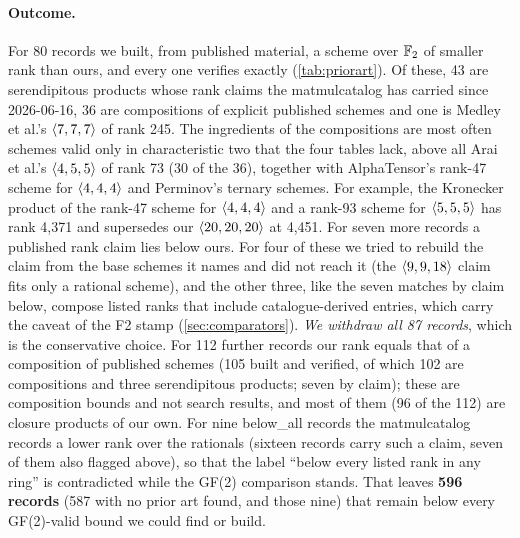 \paragraph{Outcome.}
For 80 records we built, from published material, a scheme over ${\mathbb{F}_2}$ of smaller rank than ours, and every one verifies exactly (\cref{tab:priorart}). Of these, 43 are serendipitous products whose rank claims the matmulcatalog has carried since 2026-06-16, 36 are compositions of explicit published schemes and one is Medley et al.'s $\langle 7,7,7\rangle$ of rank 245.
The ingredients of the compositions are most often schemes valid only in characteristic two that the four tables lack, above all Arai et al.'s $\langle 4,5,5\rangle$ of rank 73 (30 of the 36), together with AlphaTensor's rank-47 scheme for $\langle 4,4,4\rangle$ and Perminov's ternary schemes. For example, the Kronecker product of the rank-47 scheme for $\langle 4,4,4\rangle$ and a rank-93 scheme for $\langle 5,5,5\rangle$ \cite{moosbauer2025flip} has rank 4{,}371 and supersedes our $\langle 20,20,20\rangle$ at 4{,}451.
For seven more records a published rank claim lies below ours. For four of these we tried to rebuild the claim from the base schemes it names and did not reach it (the $\langle 9,9,18\rangle$ claim fits only a rational scheme), and the other three, like the seven matches by claim below, compose listed ranks that include catalogue-derived entries, which carry the caveat of the F2 stamp (\cref{sec:comparators}). \emph{We withdraw all 87 records}, which is the conservative choice.
For 112 further records our rank equals that of a composition of published schemes (105 built and verified, of which 102 are compositions and three serendipitous products; seven by claim); these are composition bounds and not search results, and most of them (96 of the 112) are closure products of our own.
For nine \textsf{below\_all} records the matmulcatalog records a lower rank over the rationals (sixteen records carry such a claim, seven of them also flagged above), so that the label ``below every listed rank in any ring'' is contradicted while the GF(2) comparison stands.
That leaves \textbf{596 records} (587 with no prior art found, and those nine) that remain below every GF(2)-valid bound we could find or build.

\begin{table}[t]
\centering\small

\caption{Prior-art outcome by lineage family (codes as in \cref{tab:families}). ``Superseded'' and ``matched'' are as in \cref{tab:priorart}; ``remaining'' includes the nine rational-claim cases.}
\label{tab:priorart-family}
\end{table}

